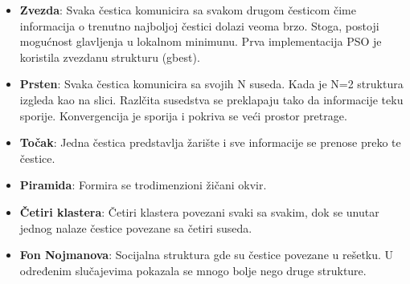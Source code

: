 \documentclass[a4paper]{article}
\begin{document}
\begin{itemize}
    \item \textbf{Zvezda}: Svaka čestica komunicira sa svakom drugom česticom čime informacija o trenutno najboljoj čestici dolazi veoma brzo. Stoga, postoji mogućnost glavljenja u lokalnom minimunu. Prva implementacija PSO je koristila zvezdanu strukturu (gbest).
    \item \textbf{Prsten}: Svaka čestica komunicira sa svojih N suseda. Kada je N=2 struktura izgleda kao na slici. Razlčita susedstva se preklapaju tako da informacije teku sporije. Konvergencija je sporija i pokriva se veći prostor pretrage.
    \item \textbf{Točak}: Jedna čestica predstavlja žarište i sve informacije se prenose preko te čestice.
    \item \textbf{Piramida}: Formira se trodimenzioni žičani okvir.
    \item \textbf{Četiri klastera}: Četiri klastera povezani svaki sa svakim, dok se unutar jednog nalaze čestice povezane sa četiri suseda.
    \item \textbf{Fon Nojmanova}: Socijalna struktura gde su čestice povezane u rešetku. U određenim slučajevima pokazala se mnogo bolje nego druge strukture.
\end{itemize}
\end{document}
